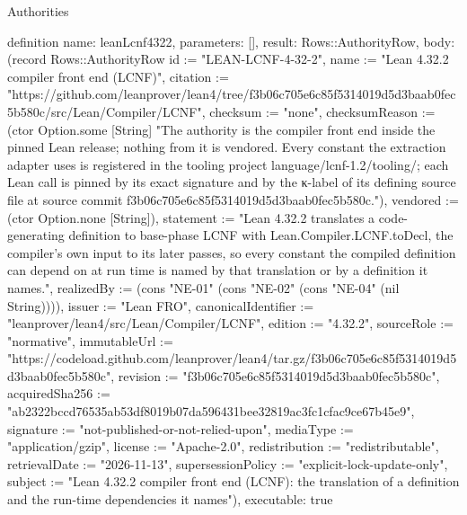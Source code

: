 \begin{lexlean}{Authorities}
\begin{semanticmodule}
definition{
  name: leanLcnf4322,
  parameters: [],
  result: Rows::AuthorityRow,
  body: (record Rows::AuthorityRow {id := "LEAN-LCNF-4-32-2", name := "Lean 4.32.2 compiler front end (LCNF)", citation := "https://github.com/leanprover/lean4/tree/f3b06c705e6c85f5314019d5d3baab0fec5b580c/src/Lean/Compiler/LCNF", checksum := "none", checksumReason := (ctor Option.some [String] "The authority is the compiler front end inside the pinned Lean release; nothing from it is vendored. Every constant the extraction adapter uses is registered in the tooling project language/lcnf-1.2/tooling/; each Lean call is pinned by its exact signature and by the κ-label of its defining source file at source commit f3b06c705e6c85f5314019d5d3baab0fec5b580c."), vendored := (ctor Option.none [String]), statement := "Lean 4.32.2 translates a code-generating definition to base-phase LCNF with Lean.Compiler.LCNF.toDecl, the compiler's own input to its later passes, so every constant the compiled definition can depend on at run time is named by that translation or by a definition it names.", realizedBy := (cons "NE-01" (cons "NE-02" (cons "NE-04" (nil String)))), issuer := "Lean FRO", canonicalIdentifier := "leanprover/lean4/src/Lean/Compiler/LCNF", edition := "4.32.2", sourceRole := "normative", immutableUrl := "https://codeload.github.com/leanprover/lean4/tar.gz/f3b06c705e6c85f5314019d5d3baab0fec5b580c", revision := "f3b06c705e6c85f5314019d5d3baab0fec5b580c", acquiredSha256 := "ab2322bccd76535ab53df8019b07da596431bee32819ac3fc1cfac9ce67b45e9", signature := "not-published-or-not-relied-upon", mediaType := "application/gzip", license := "Apache-2.0", redistribution := "redistributable", retrievalDate := "2026-11-13", supersessionPolicy := "explicit-lock-update-only", subject := "Lean 4.32.2 compiler front end (LCNF): the translation of a definition and the run-time dependencies it names"}),
  executable: true
}


\end{semanticmodule}
\end{lexlean}
